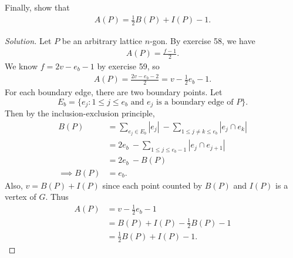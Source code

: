 \documentclass[12pt]{article}
\newenvironment{exercise}[2][Exercise]{\begin{trivlist}
        \item[\hskip \labelsep {\bfseries #1}\hskip \labelsep {\bfseries #2.}]}{\end{trivlist}}
\newenvironment{solution}
        {\begin{proof}[Solution]}
                    {\end{proof}}
\begin{document}
\begin{exercise}{60}
    Finally, show that
    \begin{align*}
        A(P) = \frac{1}{2} B(P) + I(P) -1 .
    \end{align*}
    \begin{solution}
        Let \( P \) be an arbitrary lattice \( n \)-gon. By exercise 58, we have
        \begin{align*}
            A(P) = \frac{f-1}{2} .
        \end{align*}
        We know \( f = 2v- e_{b} - 1 \) by exercise 59, so
        \begin{align*}
            A(P) = \frac{2v-e_{b} -2}{2} = v - \frac{1}{2} e_{b} - 1 .
        \end{align*}
        For each boundary edge, there are two boundary points. Let
        $$ E_{b} = \{e_{j} : 1 \leq j \leq e_{b} \text{ and } e_{j} \text{ is a boundary edge of } P\} . $$
        Then by the inclusion-exclusion principle,
        \begin{align*}
            B(P) &= \sum_{e_{j} \in E_{b}} \left| e_{j} \right|\  - \sum_{1 \leq j \neq k \leq e_{b}} \left| e_{j} \cap e_{k} \right|\\
            &= 2 e_{b} \ - \sum_{1 \leq j \leq e_{b} -1} \left|e_{j} \cap e_{j+1}\right|\\
            &= 2 e_{b}\  - B(P)\\
            \implies B(P) &= e_{b} .
        \end{align*}
        Also, \( v = B(P) + I(P) \) since each point counted by \( B(P) \) and \( I(P) \) is a vertex of \( G. \) Thus
        \begin{align*}
            A(P) &= v - \frac{1}{2} e_{b} - 1 \\
            &= B(P) + I(P) - \frac{1}{2} B(P) -1\\
            &= \frac{1}{2} B(P) + I(P) -1.
        \end{align*}
    \end{solution}
\end{exercise}
\end{document}
